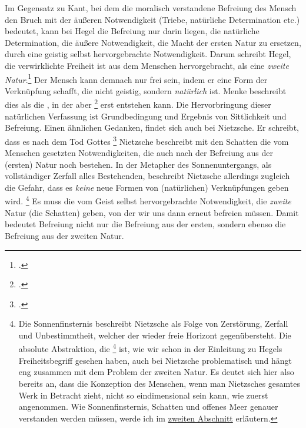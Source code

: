 \documentclass[12pt, a4paper, openany]{report}
\begin{document}
Im Gegensatz zu Kant, bei dem die moralisch verstandene Befreiung des Mensch den Bruch mit der äußeren Notwendigkeit (Triebe, natürliche Determination etc.) bedeutet, kann bei Hegel die Befreiung nur darin liegen, die natürliche Determination, die äußere Notwendigkeit, die Macht der ersten Natur zu ersetzen, durch eine geistig selbst hervorgebrachte Notwendigkeit.
Darum schreibt Hegel, die verwirklichte Freiheit ist aus dem Menschen hervorgebracht, als eine \emph{zweite Natur}.\footcite[Vlg.][§4, S. 34.]{hegel_grundlinien_2017}
Der Mensch kann demnach nur frei sein, indem er eine Form der Verknüpfung schafft, die nicht geistig, sondern \emph{natürlich} ist. 
Menke beschreibt dies als die , in der aber \footcite[][40. Hervorhebung von mir]{menke_autonomie_2018} erst entstehen kann.
Die Hervorbringung dieser natürlichen Verfassung ist Grundbedingung und Ergebnis von Sittlichkeit und Befreiung.
Einen ähnlichen Gedanken, findet sich auch bei Nietzsche. Er schreibt, dass es nach dem Tod Gottes \footcite[][§108, S. 467.]{nietzsche_morgenrote_1999}
Nietzsche beschreibt mit den Schatten die vom Menschen gesetzten Notwendigkeiten, die auch nach der Befreiung aus der (ersten) Natur noch bestehen. 
In der Metapher des Sonnenuntergangs, als vollständiger Zerfall alles Bestehenden, beschreibt Nietzsche allerdings zugleich die Gefahr, dass es \emph{keine} neue Formen von (natürlichen) Verknüpfungen geben wird.%
\footnote{
    Die Sonnenfinsternis beschreibt Nietzsche als Folge von Zerstörung, Zerfall und Unbestimmtheit, welcher der wieder freie Horizont gegenübersteht. 
    Die absolute Abstraktion, die \footcite[][§5, S. 39.]{hegel_grundlinien_2017} ist, wie wir schon in der Einleitung zu Hegels Freiheitsbegriff gesehen haben, auch bei Nietzsche problematisch und hängt eng zusammen mit dem Problem der zweiten Natur.
    Es deutet sich hier also bereits an, dass die Konzeption des  Menschen, wenn man Nietzsches gesamtes Werk in Betracht zieht, nicht so eindimensional sein kann, wie zuerst angenommen.
    Wie Sonnenfinsternis, Schatten und offenes Meer genauer verstanden werden müssen, werde ich im \hyperref[abschnitt_2]{zweiten Abschnitt} erläutern.
}
Es muss die vom Geist selbst hervorgebrachte Notwendigkeit, die \emph{zweite} Natur (die Schatten) geben, von der wir uns dann erneut befreien müssen.
Damit bedeutet Befreiung nicht nur die Befreiung aus der ersten, sondern ebenso die Befreiung aus der zweiten Natur. 
\end{document}
